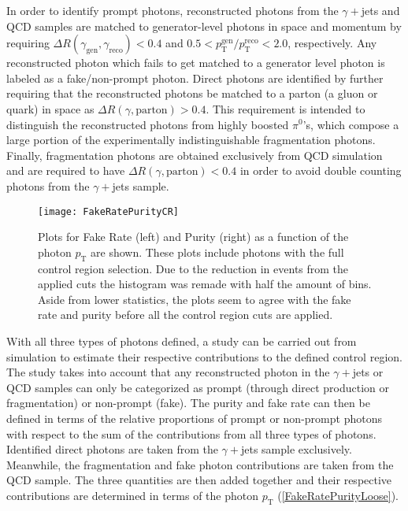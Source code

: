 \vspace{1em}

In order to identify prompt photons, reconstructed photons from the $\gamma+$jets and QCD samples are matched to generator-level photons in space and momentum by requiring $\Delta R(\gamma_\text{gen},\gamma_\text{reco}) < 0.4$ and $0.5 < p_\text{T}^\text{gen}/p_\text{T}^\text{reco} < 2.0$, respectively. Any reconstructed photon which fails to get matched to a generator level photon is labeled as a fake/non-prompt photon. Direct photons are identified by further requiring that the reconstructed photons be matched to a parton (a gluon or quark) in space as $\Delta R(\gamma,\text{parton}) > 0.4$. This requirement is intended to distinguish the reconstructed photons from highly boosted $\pi^0$'s, which compose a large portion of the experimentally indistinguishable fragmentation photons. Finally, fragmentation photons are obtained exclusively from QCD simulation and are required to have $\Delta R(\gamma,\text{parton}) < 0.4$ in order to avoid double counting photons from the $\gamma+$jets sample.

\begin{figure}[H]
\begin{center}
\texttt{[image: FakeRatePurityCR]}
\end{center}
\vspace{-1em}
\caption{Plots for Fake Rate (left) and Purity (right) as a function of the photon $p_\text{T}$ are shown. These plots include photons with the full control region selection. Due to the reduction in events from the applied cuts the histogram was remade with half the amount of bins. Aside from lower statistics, the plots seem to agree with the fake rate and purity before all the control region cuts are applied.}
\label{FakeRatePurityCR}
\end{figure}

\vspace{1em}

With all three types of photons defined, a study can be carried out from simulation to estimate their respective contributions to the defined control region. The study takes into account that any reconstructed photon in the $\gamma+$jets or QCD samples can only be categorized as prompt (through direct production or fragmentation) or non-prompt (fake). The purity and fake rate can then be defined in terms of the relative proportions of prompt or non-prompt photons with respect to the sum of the contributions from all three types of photons. Identified direct photons are taken from the $\gamma+$jets sample exclusively. Meanwhile, the fragmentation and fake photon contributions are taken from the QCD sample. The three quantities are then added together and their respective contributions are determined in terms of the photon $p_\text{T}$ (\autoref{FakeRatePurityLoose}).

